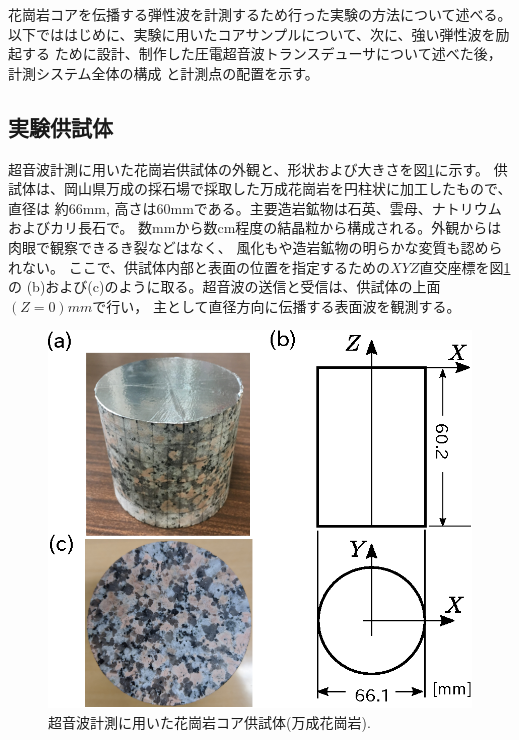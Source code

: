 花崗岩コアを伝播する弾性波を計測するため行った実験の方法について述べる。
以下でははじめに、実験に用いたコアサンプルについて、次に、強い弾性波を励起する
ために設計、制作した圧電超音波トランスデューサについて述べた後，計測システム全体の構成
と計測点の配置を示す。
\subsection{実験供試体}
超音波計測に用いた花崗岩供試体の外観と、形状および大きさを図\ref{fig:fig1}に示す。
供試体は、岡山県万成の採石場で採取した万成花崗岩を円柱状に加工したもので、直径は
約66mm, 高さは60mmである。主要造岩鉱物は石英、雲母、ナトリウムおよびカリ長石で。
数mmから数cm程度の結晶粒から構成される。外観からは肉眼で観察できるき裂などはなく、
風化もや造岩鉱物の明らかな変質も認められない。
ここで、供試体内部と表面の位置を指定するための$XYZ$直交座標を図\ref{fig:fig1}の
(b)および(c)のように取る。超音波の送信と受信は、供試体の上面$(Z=0)mm$で行い，
主として直径方向に伝播する表面波を観測する。
\begin{figure}[h]
	\begin{center}
	\includegraphics[width=0.6\linewidth]{Figs/fig1.eps} 
	\end{center}
	\caption{
		超音波計測に用いた花崗岩コア供試体(万成花崗岩).
	} 
	\label{fig:fig1}
\end{figure}
